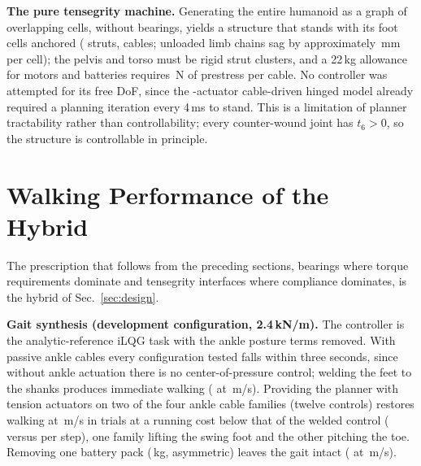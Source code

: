 \documentclass[letterpaper, 10pt, conference]{ieeeconf}
\begin{document}
\textbf{The pure tensegrity machine.} Generating the entire humanoid as a graph of overlapping cells, without
bearings, yields a structure that stands with its foot cells anchored
(\cgStruts{} struts, \cgCables{} cables; unloaded limb chains sag by
approximately \cellChainPer\,mm per cell); the pelvis and torso must be
rigid strut clusters, and a 22\,kg allowance for motors and batteries
requires \cgPreNeeded\,N of prestress per cable. No controller was
attempted for its \cgDof{} free DoF, since the \numActuatable-actuator
cable-driven hinged model already required a planning iteration every
4\,ms to stand. This is a limitation of planner tractability rather than
controllability; every counter-wound joint has $t_6>0$, so the structure is
controllable in principle.

\section{Walking Performance of the Hybrid}
\label{sec:hybridwalker}
The prescription that follows from the preceding sections, bearings where
torque requirements dominate and tensegrity interfaces where compliance
dominates, is the hybrid of Sec.~\ref{sec:design}.

\textbf{Gait synthesis (development configuration, 2.4\,kN/m).} The
controller is the analytic-reference iLQG task with the ankle posture
terms removed. With passive ankle cables every configuration tested falls
within three seconds, since without ankle actuation there is no
center-of-pressure control; welding the feet to the shanks produces
immediate walking (\weldedRate{} at \weldedV\,m/s). Providing the planner
with tension actuators on two of the four ankle cable families (twelve
controls) restores walking at \hybridSpeed\,m/s in \hybridRate{} trials at
a running cost below that of the welded control (\hybridCost{} versus
\weldedCost{} per step), one family lifting the swing foot and the other
pitching the toe. Removing one battery pack (\batteryKg\,kg, asymmetric)
leaves the gait intact (\batteryRate{} at \batteryV\,m/s).
\end{document}
